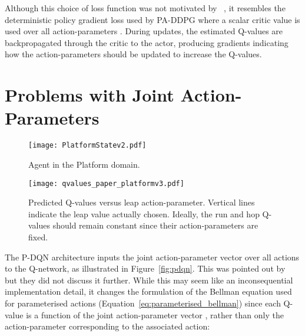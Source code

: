 \documentclass{article}
\def\PDQN*{P\nobreakdash-DQN}
\def\PADDPG*{PA\nobreakdash-DDPG}
\newcommand{\citet}[1]
{\citeauthor{#1}~\shortcite{#1}}
\newcommand{\citep}{\cite}
\begin{document}
Although this choice of loss function was not motivated by \citet{xiong2018}, it resembles the deterministic policy gradient loss used by \PADDPG* where a scalar critic value is used over all action-parameters \citep{hausknecht2016}. During updates, the estimated Q-values are backpropagated through the critic to the actor, producing gradients indicating how the action-parameters should be updated to increase the Q-values.

\section{Problems with Joint Action-Parameters}
\begin{figure*}[ht!]
	\begin{subfigure}[t]{0.32\textwidth}
		\centering
		\texttt{[image: PlatformStatev2.pdf]}
\caption{Agent in the Platform domain.}
		\label{fig:platform_state}
	\end{subfigure}\hspace{0.1cm}
	\begin{subfigure}[t]{0.67\textwidth}
		\centering
\texttt{[image: qvalues\_paper\_platformv3.pdf]}
\caption{Predicted Q-values versus leap action-parameter. Vertical lines indicate the leap value actually chosen. Ideally, the run and hop Q-values should remain constant since their action-parameters are fixed.}
		\label{fig:platform_state_qvalues}
	\end{subfigure}
	\caption[Example of sensitivity to unrelated action-parameters affecting discrete action selection]{Example of dependence on unrelated action-parameters affecting discrete action selection on the Platform domain. Three parameterised actions are available: \emph{run}, \emph{hop}, and \emph{leap}. In a particular state (), the optimal action is to run forward to be able to traverse a gap, while choosing to leap would cause the agent to fall and die. The Q-value of the leap action should change with its action-parameter, but () shows that varying the leap action-parameter while the others are kept fixed changes the Q-values predicted by \PDQN* for \emph{all} actions. Near the start of training, this can alter the discrete policy such that a suboptimal action is chosen. After  episodes, \PDQN* correctly learns to choose the optimal action regardless of the unrelated leap action-parameter, although the other Q-values still vary.}
	\label{fig:example_sensitivity}
\end{figure*}
The \PDQN* architecture inputs the joint action-parameter vector over all actions to the Q-network, as illustrated in Figure~\ref{fig:pdqn}. This was pointed out by \citet{xiong2018} but they did not discuss it further. While this may seem like an inconsequential implementation detail, it changes the formulation of the Bellman equation used for parameterised actions (Equation~\ref{eq:parameterised_bellman}) since each Q-value is a function of the joint action-parameter vector \mbox{}, rather than only the action-parameter  corresponding to the associated action:
\end{document}
